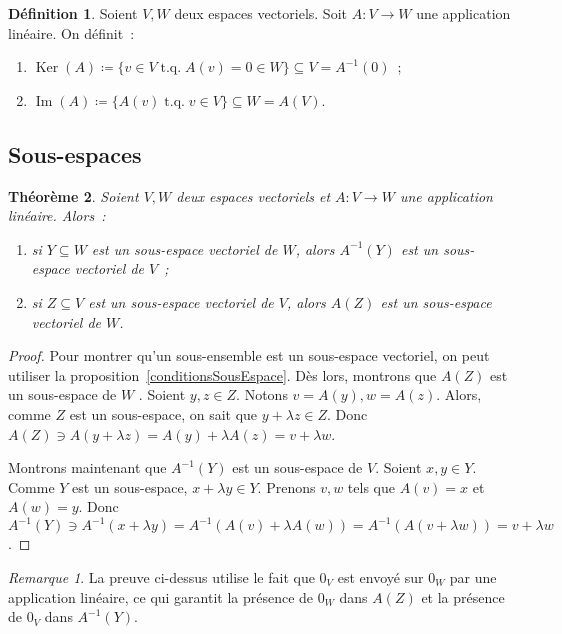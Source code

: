 \documentclass{article}
\DeclareMathOperator{\tq}{\text{ t.q. }}
\DeclareMathOperator{\Ker}{Ker}
\DeclareMathOperator{\Imf}{Im}
\newtheorem{thm}{Théorème}[section]
\theoremstyle{definition}
\newtheorem{déf}[thm]{Définition}
\theoremstyle{remark}
\newtheorem*{rmq}{Remarque}
\begin{document}
		\begin{déf} Soient $V, W$ deux espaces vectoriels. Soit $A : V \to W$ une application linéaire. On définit~:
		\begin{enumerate}
			\item $\Ker(A) \coloneqq \{v \in V \tq A(v) = 0 \in W\} \subseteq V = A^{-1}(0)$~;
			\item $\Imf(A) \coloneqq \{A(v) \tq v \in V\} \subseteq W = A(V)$.
		\end{enumerate}
		\end{déf}

	\subsection{Sous-espaces}
		\begin{thm}\label{sousEspacesApplicationLinéaire} Soient $V, W$ deux espaces vectoriels et $A : V \to W$ une application linéaire. Alors~:
		\begin{enumerate}
			\item si $Y \subseteq W$ est un sous-espace vectoriel de $W$, alors $A^{-1}(Y)$ est un sous-espace vectoriel de $V$~;
			\item si $Z \subseteq V$ est un sous-espace vectoriel de $V$, alors $A(Z)$ est un sous-espace vectoriel de $W$.
		\end{enumerate}
		\end{thm}

		\begin{proof} Pour montrer qu'un sous-ensemble est un sous-espace vectoriel, on peut utiliser la proposition~\ref{conditionsSousEspace}. Dès lors, montrons que
		$A(Z)$ est un sous-espace de $W$ . Soient $y, z \in Z$. Notons $v = A(y), w = A(z)$. Alors, comme $Z$ est un sous-espace, on sait que $y + \lambda z \in Z$. Donc
		$A(Z) \ni A(y + \lambda z) = A(y) + \lambda A(z) = v + \lambda w$.

		Montrons maintenant que $A^{-1}(Y)$ est un sous-espace de $V$. Soient $x, y \in Y$. Comme $Y$ est un sous-espace, $x + \lambda y \in Y$. Prenons $v, w$ tels que
		$A(v) = x$ et $A(w) = y$. Donc $A^{-1}(Y) \ni A^{-1}(x + \lambda y) = A^{-1}(A(v) + \lambda A(w)) = A^{-1}(A(v + \lambda w)) = v+\lambda w$. \end{proof}

		\begin{rmq} La preuve ci-dessus utilise le fait que $0_V$ est envoyé sur $0_W$ par une application linéaire, ce qui garantit la présence de $0_W$ dans $A(Z)$
		et la présence de $0_V$ dans $A^{-1}(Y)$. \end{rmq}
\end{document}
